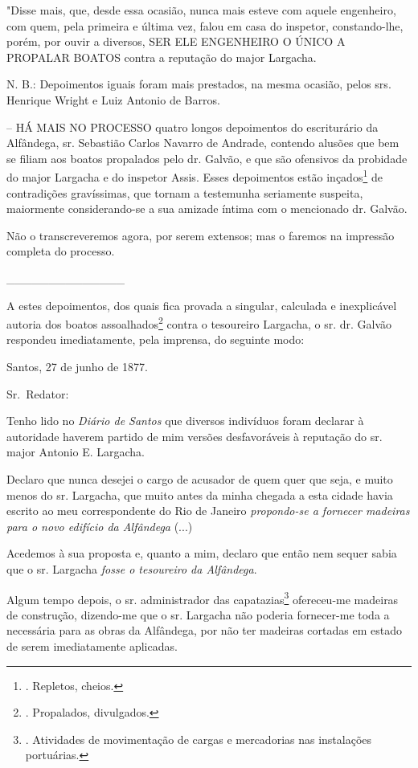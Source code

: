"Disse mais, que, desde essa ocasião, nunca mais esteve com aquele
engenheiro, com quem, pela primeira e última vez, falou em casa do
inspetor, constando-lhe, porém, por ouvir a diversos, SER ELE ENGENHEIRO
O ÚNICO A PROPALAR BOATOS contra a reputação do major Largacha.

N. B.: Depoimentos iguais foram mais prestados, na mesma ocasião, pelos
srs. Henrique Wright e Luiz Antonio de Barros.

-- HÁ MAIS NO PROCESSO quatro longos depoimentos do escriturário da
Alfândega, sr. Sebastião Carlos Navarro de Andrade, contendo alusões que
bem se filiam aos boatos propalados pelo dr. Galvão, e que são ofensivos
da probidade do major Largacha e do inspetor Assis. Esses depoimentos
estão inçados\footnote{. Repletos, cheios.} de contradições gravíssimas,
que tornam a testemunha seriamente suspeita, maiormente considerando-se
a sua amizade íntima com o mencionado dr. Galvão.

Não o transcreveremos agora, por serem extensos; mas o faremos na
impressão completa do processo.

\_\_\_\_\_\_\_\_\_\_\_\_\_\_

A estes depoimentos, dos quais fica provada a singular, calculada e
inexplicável autoria dos boatos assoalhados\footnote{. Propalados,
  divulgados.} contra o tesoureiro Largacha, o sr. dr. Galvão respondeu
imediatamente, pela imprensa, do seguinte modo:

Santos, 27 de junho de 1877.

Sr.~Redator:

Tenho lido no \emph{Diário de Santos} que diversos indivíduos foram
declarar à autoridade haverem partido de mim versões desfavoráveis à
reputação do sr. major Antonio E. Largacha.

Declaro que nunca desejei o cargo de acusador de quem quer que seja, e
muito menos do sr. Largacha, que muito antes da minha chegada a esta
cidade havia escrito ao meu correspondente do Rio de Janeiro
\emph{propondo-se a fornecer madeiras para o novo edifício da Alfândega}
(...)

Acedemos à sua proposta e, quanto a mim, declaro que então nem sequer
sabia que o sr. Largacha \emph{fosse o tesoureiro da Alfândega}.

Algum tempo depois, o sr. administrador das capatazias\footnote{.
  Atividades de movimentação de cargas e mercadorias nas instalações
  portuárias.} ofereceu-me madeiras de construção, dizendo-me que o sr.
Largacha não poderia fornecer-me toda a necessária para as obras da
Alfândega, por não ter madeiras cortadas em estado de serem
imediatamente aplicadas.

